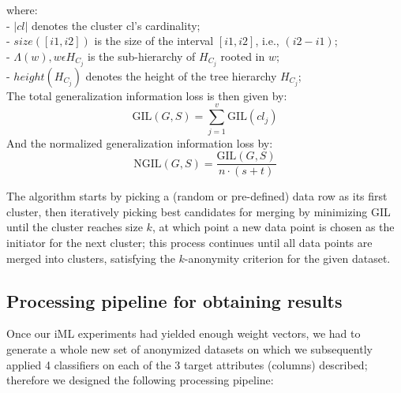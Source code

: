 \documentclass{llncs}
\providecommand{\abs}[1]{\lvert#1\rvert}
\begin{document}
where:\\
- $\abs{cl}$ denotes the cluster cl's cardinality; \\
- $size([i1,i2])$ is the size of the interval $[i1,i2]$, i.e., $(i2-i1)$; \\
- $\Lambda(w), w \epsilon H_{C_j}$ is the sub-hierarchy of $H_{C_j}$ rooted in $w$; \\
- $height(H_{C_j})$ denotes the height of the tree hierarchy $H_{C_j}$; \\


The total generalization information loss is then given by:
\begin{equation*}
\text{GIL}(G,S) = \sum_{j=1}^{v} \text{GIL}(cl_j)
\end{equation*}
And the normalized generalization information loss by:
\begin{equation*}
\text{NGIL}(G,S) = \frac{\text{GIL}(G,S)}{n \cdot (s+t)}
\end{equation*}

The algorithm starts by picking a (random or pre-defined) data row as its first cluster, then iteratively picking best candidates for merging by minimizing GIL until the cluster reaches size $k$, at which point a new data point is chosen as the initiator for the next cluster; this process continues until all data points are merged into clusters, satisfying the $k$-anonymity criterion for the given dataset.


\subsection{Processing pipeline for obtaining results}
\label{ssect:process}

Once our iML experiments had yielded enough weight vectors, we had to generate a whole new set of anonymized datasets on which we subsequently applied 4 classifiers on each of the 3 target attributes (columns) described; therefore we designed the following processing pipeline:
\end{document}

